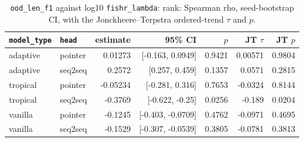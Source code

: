 \documentclass[10pt]{article}
\begin{document}
{\small
\begin{longtable}{llrrrrr}
\caption{\texttt{ood\_len\_f1} against log10 \texttt{fishr\_lambda}: rank: Spearman rho, seed-bootstrap CI, with the Jonckheere--Terpstra ordered-trend $\tau$ and $p$.}\label{tab:trend-ood_len_f1}\\
\toprule
\texttt{model\_type} & \texttt{head} & estimate & 95\% CI & $p$ & JT $\tau$ & JT $p$\\
\midrule
\endhead
adaptive & pointer & 0.01273 & [-0.163, 0.0949] & 0.9421 & 0.00571 & 0.9804\\
adaptive & seq2seq & 0.2572 & [0.257, 0.459] & 0.1357 & 0.0571 & 0.2815\\
tropical & pointer & -0.05234 & [-0.281, 0.316] & 0.7653 & -0.0324 & 0.8144\\
tropical & seq2seq & -0.3769 & [-0.622, -0.25] & 0.0256 & -0.189 & 0.0204\\
vanilla & pointer & -0.1245 & [-0.403, -0.0709] & 0.4762 & -0.0971 & 0.4695\\
vanilla & seq2seq & -0.1529 & [-0.307, -0.0539] & 0.3805 & -0.0781 & 0.3813\\
\bottomrule
\end{longtable}
}
\end{document}

